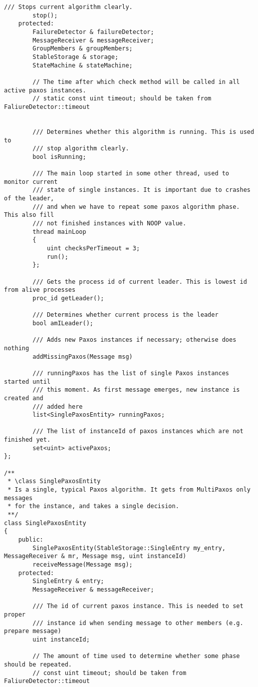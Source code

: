 {\begin{lstlisting}[frame=lines,caption=Pseudocode of Paxos algorithm]
		/// Stops current algorithm clearly.
		stop();
	protected:
		FailureDetector & failureDetector;
		MessageReceiver & messageReceiver;
		GroupMembers & groupMembers;
		StableStorage & storage;
		StateMachine & stateMachine;
		
		// The time after which check method will be called in all active paxos instances.
		// static const uint timeout; should be taken from FaliureDetector::timeout
		
		
		/// Determines whether this algorithm is running. This is used to 
		/// stop algorithm clearly.
		bool isRunning;
		
		/// The main loop started in some other thread, used to monitor current
		/// state of single instances. It is important due to crashes of the leader,
		/// and when we have to repeat some paxos algorithm phase. This also fill
		/// not finished instances with NOOP value.
		thread mainLoop
		{
			uint checksPerTimeout = 3;
			run();
		};
		
		/// Gets the process id of current leader. This is lowest id from alive processes
		proc_id getLeader();
		
		/// Determines whether current process is the leader
		bool amILeader();
		
		/// Adds new Paxos instances if necessary; otherwise does nothing
		addMissingPaxos(Message msg)
		
		/// runningPaxos has the list of single Paxos instances started until
		/// this moment. As first message emerges, new instance is created and
		/// added here
		list<SinglePaxosEntity> runningPaxos;
		
		/// The list of instanceId of paxos instances which are not finished yet.
		set<uint> activePaxos;
};

/**
 * \class SinglePaxosEntity
 * Is a single, typical Paxos algorithm. It gets from MultiPaxos only messages
 * for the instance, and takes a single decision.
 **/
class SinglePaxosEntity
{
	public:
		SinglePaxosEntity(StableStorage::SingleEntry my_entry, MessageReceiver & mr, Message msg, uint instanceId)
		receiveMessage(Message msg);
	protected:
		SingleEntry & entry;
		MessageReceiver & messageReceiver;
		
		/// The id of current paxos instance. This is needed to set proper
		/// instance id when sending message to other members (e.g. prepare message)
		uint instanceId;
	
		// The amount of time used to determine whether some phase should be repeated.
		// const uint timeout; should be taken from FaliureDetector::timeout
		

\end{lstlisting}}
